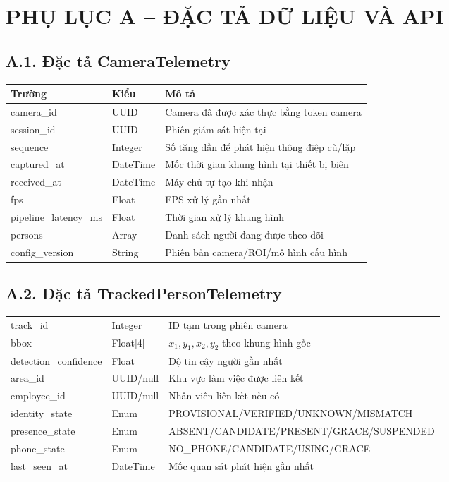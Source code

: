 \clearpage
\section*{PHỤ LỤC A -- ĐẶC TẢ DỮ LIỆU VÀ API}

\subsection*{A.1. Đặc tả CameraTelemetry}
\begin{longtable}{p{3.5cm}p{2.5cm}p{7.2cm}}
\toprule
\textbf{Trường} & \textbf{Kiểu} & \textbf{Mô tả}\\
\midrule\endfirsthead
camera\_id & UUID & Camera đã được xác thực bằng token camera\\
session\_id & UUID & Phiên giám sát hiện tại\\
sequence & Integer & Số tăng dần để phát hiện thông điệp cũ/lặp\\
captured\_at & DateTime & Mốc thời gian khung hình tại thiết bị biên\\
received\_at & DateTime & Máy chủ tự tạo khi nhận\\
fps & Float & FPS xử lý gần nhất\\
pipeline\_\allowbreak latency\_ms & Float & Thời gian xử lý khung hình\\
persons & Array & Danh sách người đang được theo dõi\\
config\_version & String & Phiên bản camera/ROI/mô hình cấu hình\\
\bottomrule
\end{longtable}

\subsection*{A.2. Đặc tả TrackedPersonTelemetry}
\begin{longtable}{p{3.3cm}p{2.5cm}p{7.4cm}}
\toprule
track\_id & Integer & ID tạm trong phiên camera\\
bbox & Float[4] & $x_1,y_1,x_2,y_2$ theo khung hình gốc\\
detection\_\allowbreak confidence & Float & Độ tin cậy người gần nhất\\
area\_id & UUID/null & Khu vực làm việc được liên kết\\
employee\_id & UUID/null & Nhân viên liên kết nếu có\\
identity\_state & Enum & PROVISIONAL/\allowbreak VERIFIED/\allowbreak UNKNOWN/\allowbreak MISMATCH\\
presence\_state & Enum & ABSENT/\allowbreak CANDIDATE/\allowbreak PRESENT/\allowbreak GRACE/\allowbreak SUSPENDED\\
phone\_state & Enum & NO\_PHONE/\allowbreak CANDIDATE/\allowbreak USING/\allowbreak GRACE\\
last\_seen\_at & DateTime & Mốc quan sát phát hiện gần nhất\\
\bottomrule
\end{longtable}

